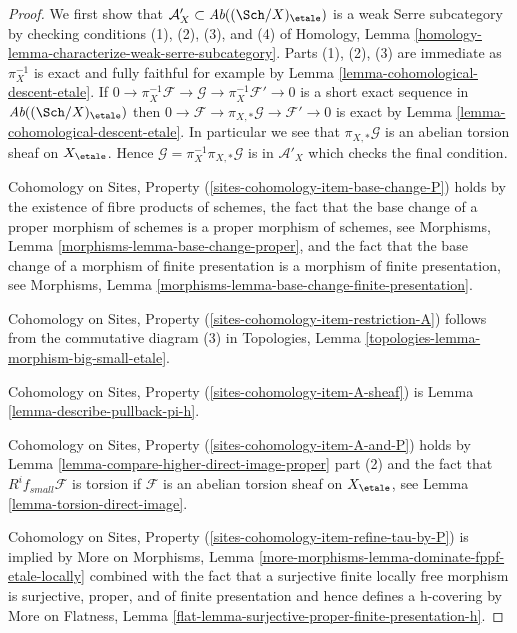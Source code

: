\begin{proof}
We first show that $\mathcal{A}'_X \subset \textit{Ab}((\Sch/X)_\etale)$
is a weak Serre subcategory by checking conditions (1), (2), (3), and (4)
of Homology, Lemma \ref{homology-lemma-characterize-weak-serre-subcategory}.
Parts (1), (2), (3) are immediate as $\pi_X^{-1}$ is exact and
fully faithful for example by Lemma \ref{lemma-cohomological-descent-etale}. If
$0 \to \pi_X^{-1}\mathcal{F} \to \mathcal{G} \to \pi_X^{-1}\mathcal{F}' \to 0$
is a short exact sequence in $\textit{Ab}((\Sch/X)_\etale)$
then $0 \to \mathcal{F} \to \pi_{X, *}\mathcal{G} \to \mathcal{F}' \to 0$
is exact by Lemma \ref{lemma-cohomological-descent-etale}.
In particular we see that $\pi_{X, *}\mathcal{G}$ is an abelian
torsion sheaf on $X_\etale$.
Hence $\mathcal{G} = \pi_X^{-1}\pi_{X, *}\mathcal{G}$ is in
$\mathcal{A}'_X$ which checks the final condition.

\medskip\noindent
Cohomology on Sites, Property (\ref{sites-cohomology-item-base-change-P}) holds
by the existence of fibre products of schemes,
the fact that the base change of a proper morphism of
schemes is a proper morphism of schemes, see
Morphisms, Lemma \ref{morphisms-lemma-base-change-proper}, and
the fact that the base change of a morphism of finite presentation
is a morphism of finite presentation, see
Morphisms, Lemma \ref{morphisms-lemma-base-change-finite-presentation}.

\medskip\noindent
Cohomology on Sites, Property (\ref{sites-cohomology-item-restriction-A})
follows from the commutative diagram (3) in
Topologies, Lemma \ref{topologies-lemma-morphism-big-small-etale}.

\medskip\noindent
Cohomology on Sites, Property (\ref{sites-cohomology-item-A-sheaf}) is
Lemma \ref{lemma-describe-pullback-pi-h}.

\medskip\noindent
Cohomology on Sites, Property (\ref{sites-cohomology-item-A-and-P}) holds by
Lemma \ref{lemma-compare-higher-direct-image-proper} part (2)
and the fact that $R^if_{small}\mathcal{F}$
is torsion if $\mathcal{F}$ is an abelian torsion
sheaf on $X_\etale$, see Lemma \ref{lemma-torsion-direct-image}.

\medskip\noindent
Cohomology on Sites, Property (\ref{sites-cohomology-item-refine-tau-by-P})
is implied by More on Morphisms, Lemma
\ref{more-morphisms-lemma-dominate-fppf-etale-locally}
combined with the fact that a surjective finite locally free morphism
is surjective, proper, and of finite presentation and hence
defines a h-covering by More on Flatness, Lemma
\ref{flat-lemma-surjective-proper-finite-presentation-h}.
\end{proof}

